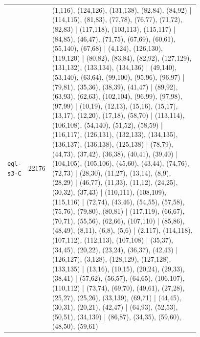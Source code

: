 \begin{landscape}
\begin{longtable}{lr>{\tiny\raggedright\arraybackslash}p{0.78\linewidth}}
\texttt{egl-s3-C} & 22176 & (1,116), (124,126), (131,138), (82,84), (84,92) | (114,115), (81,83), (77,78), (76,77), (71,72), (82,83) | (117,118), (103,113), (115,117) | (84,85), (46,47), (71,75), (67,69), (60,61), (55,140), (67,68) | (4,124), (126,130), (119,120) | (80,82), (83,84), (82,92), (127,129), (131,132), (133,134), (134,136) | (49,140), (53,140), (63,64), (99,100), (95,96), (96,97) | (79,81), (35,36), (38,39), (41,47) | (89,92), (63,93), (62,63), (102,104), (96,99), (97,98), (97,99) | (10,19), (12,13), (15,16), (15,17), (13,17), (12,20), (17,18), (58,70) | (113,114), (106,108), (54,140), (51,52), (58,59) | (116,117), (126,131), (132,133), (134,135), (136,137), (136,138), (125,138) | (78,79), (44,73), (37,42), (36,38), (40,41), (39,40) | (104,105), (105,106), (45,60), (43,44), (74,76), (72,73) | (28,30), (11,27), (13,14), (8,9), (28,29) | (46,77), (11,33), (11,12), (24,25), (30,32), (37,43) | (110,111), (108,109), (115,116) | (72,74), (43,46), (54,55), (57,58), (75,76), (79,80), (80,81) | (117,119), (66,67), (70,71), (55,56), (62,66), (107,110) | (85,86), (48,49), (8,11), (6,8), (5,6) | (2,117), (114,118), (107,112), (112,113), (107,108) | (35,37), (34,45), (20,22), (23,24), (36,37), (42,43) | (126,127), (3,128), (128,129), (127,128), (133,135) | (13,16), (10,15), (20,24), (29,33), (38,41) | (57,62), (56,57), (64,65), (106,107), (110,112) | (73,74), (69,70), (49,61), (27,28), (25,27), (25,26), (33,139), (69,71) | (44,45), (30,31), (20,21), (42,47) | (64,93), (52,53), (50,51), (34,139) | (86,87), (34,35), (59,60), (48,50), (59,61) \\[2pt]

\end{longtable}
\end{landscape}
